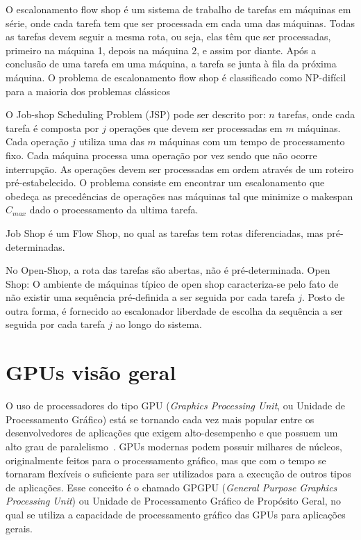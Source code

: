 O escalonamento flow shop é um sistema de trabalho de tarefas em máquinas em série, onde cada tarefa tem que ser processada em cada uma das máquinas. Todas as tarefas devem seguir a mesma rota, ou seja, elas têm que ser processadas, primeiro na máquina 1, depois na máquina 2, e assim por diante. Após a conclusão de uma tarefa em uma máquina, a tarefa se junta à fila da próxima máquina. O problema de escalonamento flow shop é classificado como NP-difícil para a maioria dos problemas clássicos

O Job-shop Scheduling Problem (JSP) pode ser descrito por: $n$ tarefas, onde cada tarefa é composta por $j$ operações que devem ser processadas em $m$ máquinas. Cada operação $j$ utiliza uma das $m$ máquinas com um tempo de processamento fixo. Cada máquina processa uma operação por vez sendo que não ocorre interrupção. As operações devem ser processadas em ordem através de um roteiro pré-estabelecido. O problema consiste em encontrar um escalonamento que obedeça as precedências de operações nas máquinas tal que minimize o makespan $C_{max}$ dado o processamento da ultima tarefa. 

Job Shop é um Flow Shop, no qual as tarefas tem rotas diferenciadas, mas pré-determinadas.

No Open-Shop, a rota das tarefas são abertas, não é pré-determinada. Open Shop: O ambiente de máquinas típico de open shop caracteriza-se pelo fato de não existir uma sequência pré-definida a ser seguida por cada tarefa $j$. Posto de outra forma, é fornecido ao escalonador liberdade de escolha da sequência a ser seguida por cada tarefa $j$ ao longo do sistema.



\section{GPUs visão geral}
O uso de processadores do tipo GPU (\textit{Graphics Processing Unit}, ou
Unidade de Processamento Gráfico) está se tornando cada vez mais popular entre
os desenvolvedores de aplicações que exigem alto-desempenho e que possuem um
alto grau de paralelismo~\cite{gpu}. GPUs modernas podem possuir milhares de
núcleos, originalmente feitos para o processamento gráfico, mas que com o tempo
se tornaram flexíveis o suficiente para ser utilizados para a execução de outros
tipos de aplicações. Esse conceito é o chamado GPGPU (\textit{General Purpose
  Graphics Processing Unit}) ou Unidade de Processamento Gráfico de Propósito
Geral, no qual se utiliza a capacidade de processamento gráfico das GPUs para
aplicações gerais. 

